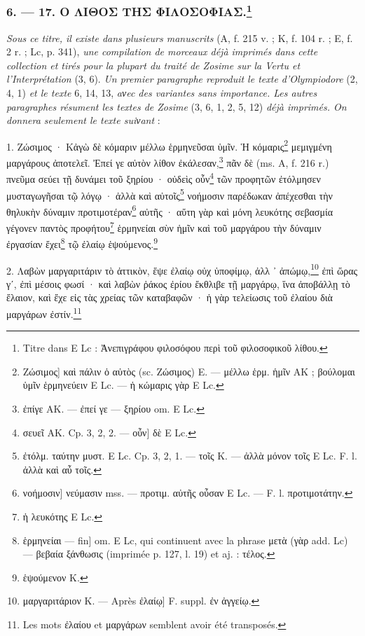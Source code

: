 \documentclass[a4paper, 11pt, oneside, polutonikogreek, french]{article}
\begin{document}
\bigskip
\centerline{\EightStarTaper}
\centerline{\EightStarTaper\EightStarTaper}
\bigskip

\subsubsection[6. --- 17. Ο ΛΙΘΟΣ ΤΗΣ ΦΙΛΟΣΟΦΙΑΣ.]{6. --- 17. Ο ΛΙΘΟΣ ΤΗΣ ΦΙΛΟΣΟΦΙΑΣ.\footnote{Titre dans E Lc : Ἀνεπιγράφου φιλοσόφου περὶ τοῦ φιλοσοφικοῦ λίθου.}}

\emph{Sous ce titre, il existe dans plusieurs manuscrits} (A, f. 215 v. ; K, f. 104 r. ; E, f. 2 r. ; Lc, p. 341), \emph{une compilation de morceaux déjà imprimés dans cette collection et tirés pour la plupart du traité de Zosime sur la Vertu et l'Interprétation} (3, 6). \emph{Un premier paragraphe reproduit le texte d'Olympiodore} (2, 4, 1) \emph{et le texte} 6, 14, 13, \emph{aνec des variantes sans importance. Les autres paragraphes résument les textes de Zosime} (3, 6, 1, 2, 5, 12) \emph{déjà imprimés. On donnera seulement le texte suiνant} :

1. Ζώσιμος · Κἀγὼ δὲ κόμαριν μέλλω ἑρμηνεῦσαι ὑμῖν. Ἡ κόμαρις\footnote{Ζώσιμος] καὶ πάλιν ὁ αὐτὸς (sc. Ζώσιμος) E. --- μέλλω ἑρμ. ἡμῖν AK ; βούλομαι ὑμῖν ἑρμηνεύειν E Lc. --- ἡ κώμαρις γὰρ E Lc.} μεμιγμένη μαργάρους ἀποτελεῖ. Ἐπεί γε αὐτὸν λίθον ἐκάλεσαν,\footnote{ἐπίγε AK. --- ἐπεί γε --- ξηρίου om. E Lc.} πᾶν δὲ (ms. Α, f. 216 r.) πνεῦμα σεύει τῇ δυνάμει τοῦ ξηρίου · οὐδεὶς οὖν\footnote{σευεῖ AK. Cp. 3, 2, 2. --- οὖν] δὲ E Lc.} τῶν προφητῶν ἐτόλμησεν μυσταγωγῆσαι τῷ λόγῳ · ἀλλὰ καὶ αὐτοῖς\footnote{ἐτόλμ. ταύτην μυστ. E Lc. Cp. 3, 2, 1. --- τοῖς K. --- ἀλλὰ μόνον τοῖς E Lc. F. l. ἀλλὰ καὶ αὖ τοῖς.} νοήμοσιν παρέδωκαν ἀπέχεσθαι τὴν θηλυκὴν δύναμιν προτιμοτέραν\footnote{νοήμοσιν] νεύμασιν mss. --- προτιμ. αὐτῆς οὖσαν E Lc. --- F. l. προτιμοτάτην.} αὐτῆς · αὕτη γὰρ καὶ μόνη λευκότης σεβασμία γέγονεν παντὸς προφήτου\footnote{ἡ λευκότης E Lc.} ἑρμηνείαι σὺν ἡμῖν καὶ τοῦ μαργάρου τὴν δύναμιν ἐργασίαν ἔχει\footnote{ἑρμηνείαι --- fin] om. E Lc, qui continuent avec la phrase μετὰ (γὰρ add. Lc) --- βεβαία ξάνθωσις (imprimée p. 127, l. 19) et aj. : τέλος.} τῷ ἐλαίῳ ἑψούμενος.\footnote{ἑψούμενον K.}

2. Λαβὼν μαργαριτάριν τὸ ἀττικὸν, ἕψε ἐλαίῳ οὐχ ὑποφίμῳ, ἀλλ ᾽ ἀπώμῳ,\footnote{μαργαριτάριον K. --- Après ἐλαίῳ] F. suppl. ἐν ἀγγείῳ.} ἐπὶ ὥρας γʹ, ἐπὶ μέσοις φωσί · καὶ λαβὼν ῥάκος ἐρίου ἔκθλιβε τῇ μαργάρῳ, ἵνα ἀποβάλλῃ τὸ ἔλαιον, καὶ ἔχε εἰς τὰς χρείας τῶν καταβαφῶν · ἡ γὰρ τελείωσις τοῦ ἐλαίου διὰ μαργάρων ἐστίν.\footnote{Les mots ἐλαίου et μαργάρων semblent avoir été transposés.}
\end{document}
